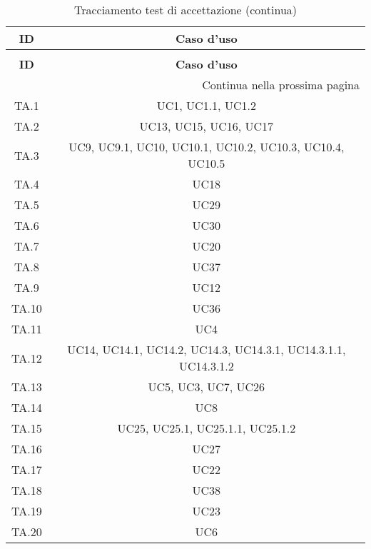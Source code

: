 \bgroup
\begin{adjustwidth}{-0.5cm}{-0.5cm}
	\centering
  \begin{longtable}{|c|c|}
		\caption{Tracciamento test di accettazione}
  	\label{tab:tracciamento-test-accettazione} \\
    \hline
		\textbf{ID} & \textbf{Caso d'uso} \\
		\hline
		\endfirsthead

		\caption[]{Tracciamento test di accettazione (continua)} \\
		\hline
		\textbf{ID} & \textbf{Caso d'uso} \\
		\hline
		\endhead

		\hline
		\multicolumn{2}{|r|}{{Continua nella prossima pagina}} \\
		\hline
		\endfoot

		\hline
		\endlastfoot

    TA.1 & UC1, UC1.1, UC1.2\\
		\hline TA.2 & UC13, UC15, UC16, UC17\\
		\hline TA.3 & UC9, UC9.1, UC10, UC10.1, UC10.2, UC10.3, UC10.4, UC10.5\\
		\hline TA.4 & UC18\\
		\hline TA.5 & UC29\\
		\hline TA.6 & UC30\\
		\hline TA.7 & UC20\\
		\hline TA.8 & UC37\\
		\hline TA.9 & UC12\\
		\hline TA.10 & UC36\\
		\hline TA.11 & UC4\\
		\hline TA.12 & UC14, UC14.1, UC14.2, UC14.3, UC14.3.1, UC14.3.1.1, UC14.3.1.2\\
		\hline TA.13 & UC5, UC3, UC7, UC26\\
		\hline TA.14 & UC8\\
		\hline TA.15 & UC25, UC25.1, UC25.1.1, UC25.1.2\\
		\hline TA.16 & UC27\\
		\hline TA.17 & UC22\\
		\hline TA.18 & UC38\\
		\hline TA.19 & UC23\\
		\hline TA.20 & UC6\\
  \end{longtable}
\end{adjustwidth}
\egroup
